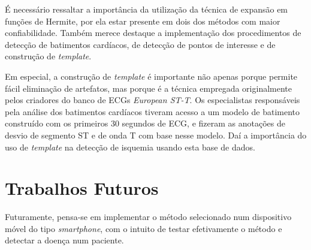 É necessário ressaltar a importância da utilização da técnica de expansão em funções de Hermite, por ela estar presente em dois dos métodos com maior confiabilidade. Também merece destaque a implementação dos procedimentos de detecção de batimentos cardíacos, de detecção de pontos de interesse e de construção de \emph{template}.

Em especial, a construção de \emph{template} é importante não apenas porque permite fácil eliminação de artefatos, mas porque é a técnica empregada originalmente pelos criadores do banco de ECGs \emph{European ST-T}. Os especialistas responsáveis pela análise dos batimentos cardíacos tiveram acesso a um modelo de batimento construído com os primeiros 30 segundos de ECG, e fizeram as anotações de desvio de segmento ST e de onda T com base nesse modelo. Daí a importância do uso de \emph{template} na detecção de isquemia usando esta base de dados.


\section{Trabalhos Futuros}

Futuramente, pensa-se em implementar o método selecionado num dispositivo móvel do tipo \emph{smartphone}, com o intuito de testar efetivamente o método e detectar a doença num paciente.
